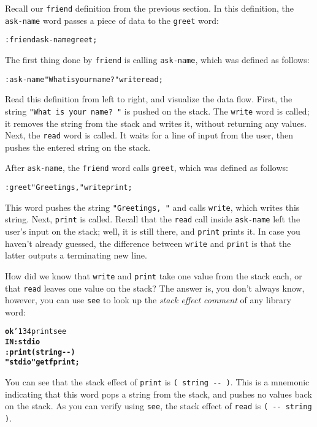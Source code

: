 \documentclass[english]{book}
\newcommand{\ttbackslash}{\char'134}
\begin{document}
Recall our \texttt{friend} definition from the previous section. In this definition, the \texttt{ask-name} word passes a piece of data to the \texttt{greet} word:

\begin{alltt}
: friend ask-name greet ;
\end{alltt}

The first thing done by \texttt{friend} is calling \texttt{ask-name}, which was defined as follows:

\begin{alltt}
: ask-name "What is your name? " write read ;
\end{alltt}

Read this definition from left to right, and visualize the data flow. First, the string \texttt{"What is your name?~"} is pushed on the stack. The \texttt{write} word is called; it removes the string from the stack and writes it, without returning any values. Next, the \texttt{read} word is called. It waits for a line of input from the user, then pushes the entered string on the stack.

After \texttt{ask-name}, the \texttt{friend} word calls \texttt{greet}, which was defined as follows:

\begin{alltt}
: greet "Greetings, " write print ;
\end{alltt}

This word pushes the string  \texttt{"Greetings, "} and calls \texttt{write}, which writes this string. Next, \texttt{print} is called. Recall that the \texttt{read} call inside \texttt{ask-name} left the user's input on the stack; well, it is still there, and \texttt{print} prints it. In case you haven't already guessed, the difference between \texttt{write} and \texttt{print} is that the latter outputs a terminating new line.

How did we know that \texttt{write} and \texttt{print} take one value from the stack each, or that \texttt{read} leaves one value on the stack? The answer is, you don't always know, however, you can use \texttt{see} to look up the \emph{stack effect comment} of any library word:

\begin{alltt}
\textbf{ok} \ttbackslash print see
\textbf{IN: stdio
: print ( string -{}- )
    "stdio" get fprint ;}
\end{alltt}

You can see that the stack effect of \texttt{print} is \texttt{( string -{}- )}. This is a mnemonic indicating that this word pops a string from the stack, and pushes no values back on the stack. As you can verify using \texttt{see}, the stack effect of \texttt{read} is \texttt{( -{}- string )}.
\end{document}
